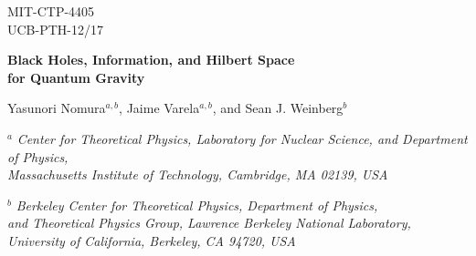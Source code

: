 \documentclass[12pt]{article}
\begin{document}
\begin{titlepage}

\begin{flushright}
MIT-CTP-4405 \\
UCB-PTH-12/17 \\
\end{flushright}

\vskip 1.0cm

\begin{center}
{\Large \bf Black Holes, Information, and Hilbert Space\\
for Quantum Gravity}

\vskip 0.7cm

{\large Yasunori Nomura$^{a,b}$, Jaime Varela$^{a,b}$, and Sean J. Weinberg$^b$}

\vskip 0.4cm

$^a$ {\it Center for Theoretical Physics, Laboratory for Nuclear Science, 
     and Department of Physics, \\
     Massachusetts Institute of Technology, Cambridge, MA 02139, USA} \\

\vskip 0.2cm

$^b$ {\it Berkeley Center for Theoretical Physics, Department of Physics, \\
     and Theoretical Physics Group, Lawrence Berkeley National Laboratory, \\
     University of California, Berkeley, CA 94720, USA} \\

\vskip 0.8cm


\end{center}
\end{titlepage}
\end{document}
